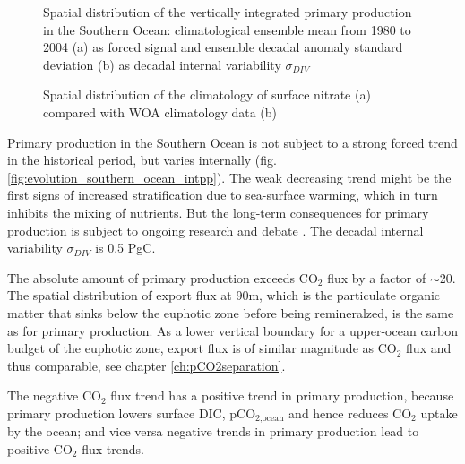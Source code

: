 \begin{figure}[h!]
	\centering
	\caption{Spatial distribution of the vertically integrated primary production in the Southern Ocean: climatological ensemble mean from 1980 to 2004 (a) as forced signal and ensemble decadal anomaly standard deviation (b) as decadal internal variability $\sigma_{DIV}$}
	\label{fig:SO_intpp_ensmean_ensstd}
\end{figure}

\begin{figure}[h!]
	\centering
	\caption{Spatial distribution of the climatology of surface nitrate (a) compared with \acs{WOA} climatology data \citep{WOA2013} (b)}
	\label{fig:SO_comp_nitrate}
\end{figure}



Primary production in the Southern Ocean is not subject to a strong forced trend in the historical period, but varies internally (fig. \ref{fig:evolution_southern_ocean_intpp}). The weak decreasing trend might be the first signs of increased stratification due to sea-surface warming, which in turn inhibits the mixing of nutrients. But the long-term consequences for primary production is subject to ongoing research and debate \citep{Bopp2013,Taucher2011,Lozier2011,Kessler2016,Krumhardt2017,Deppler2017}. The decadal internal variability $\sigma_{DIV}$ is 0.5 PgC.

The absolute amount of primary production exceeds CO$_2$ flux by a factor of $\sim$20. The spatial distribution of export flux at 90m, which is the particulate organic matter that sinks below the euphotic zone before being remineralzed, is the same as for primary production. As a lower vertical boundary for a upper-ocean carbon budget of the euphotic zone, export flux is of similar magnitude as CO$_2$ flux and thus comparable, see chapter \ref{ch:pCO2separation}.\newline

The negative CO$_2$ flux trend has a positive trend in primary production, because primary production lowers surface \acs{DIC}, pCO$_{2\text{,ocean}}$ and hence reduces CO$_2$ uptake by the ocean; and vice versa negative trends in primary production lead to positive CO$_2$ flux trends.\newline

